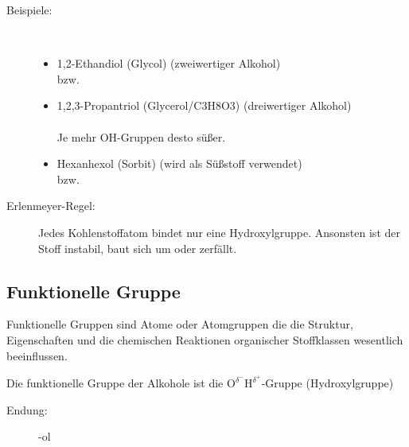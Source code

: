 \begin{description}
	\item[Beispiele:]~
	\begin{itemize}
		\item 1,2-Ethandiol (Glycol) (zweiwertiger Alkohol) \\[0.5ex]
			\hspace{3em}bzw.\hspace{3em}
		\item 1,2,3-Propantriol (Glycerol/\ac{C3H8O3}) (dreiwertiger Alkohol) \\[0.5ex]
			 \\[0.8ex]
			Je mehr OH-Gruppen desto süßer.
			\newpage
		\item Hexanhexol (Sorbit) (wird als Süßstoff verwendet) \\[0.5ex]
			\hspace{1em}bzw.\hspace{1em}
	\end{itemize}
\end{description}

\begin{description}
	\item[Erlenmeyer-Regel:] Jedes Kohlenstoffatom bindet nur eine Hydroxylgruppe.
		Ansonsten ist der Stoff instabil, baut sich um oder zerfällt.
\end{description}

\subsection{Funktionelle Gruppe}
Funktionelle Gruppen sind Atome oder Atomgruppen die die Struktur, Eigenschaften
und die chemischen Reaktionen organischer Stoffklassen wesentlich beeinflussen.

Die funktionelle Gruppe der Alkohole ist die
$\mathrm{O}^{\delta^-}\mathrm{H}^{\delta^+}$-Gruppe
(Hydroxylgruppe)

\begin{description}
	\item[Endung:] -ol
\end{description}

